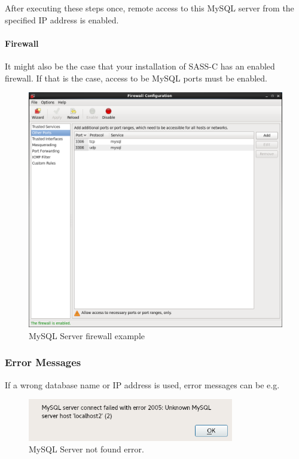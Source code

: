 After executing these steps once, remote access to this MySQL server from the specified IP address is enabled.

\paragraph{Firewall}

It might also be the case that your installation of SASS-C has an enabled firewall. If that is the case, access to be MySQL ports must be enabled.

\begin{figure}[H]
  \center
    \includegraphics[width=15cm,frame]{../screenshots/centos_firewall.png}
  \caption{MySQL Server firewall example}
\end{figure}

\subsubsection{Error Messages}

If  a  wrong  database  name  or  IP  address  is  used,  error  messages  can  be  e.g.  \\

\begin{figure}[H]
  \center
    \includegraphics[width=9cm,frame]{../screenshots/mysql_connect_error.png}
  \caption{MySQL Server not found error.}
\end{figure}

